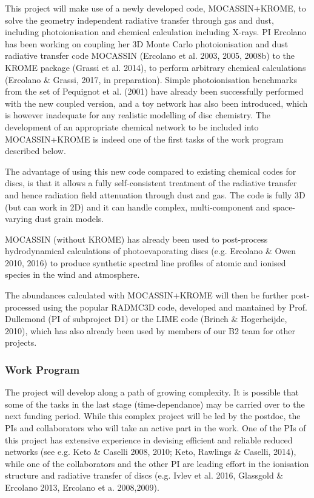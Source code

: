 \documentclass[10pt,fleqn,twoside]{article}
\newcommand{\Tcol}{\color{blue}}
\begin{document}
This project will make use of a newly developed code, MOCASSIN+KROME, to solve the geometry independent radiative transfer through gas  and dust, including photoionisation and chemical calculation
  including X-rays. PI Ercolano has been working on coupling her 3D Monte Carlo photoionisation
and dust radiative transfer code MOCASSIN (Ercolano et al. 2003, 2005,
2008b) to the KROME package (Grassi et al. 2014), to perform arbitrary
chemical calculations (Ercolano \& Grassi, 2017, in
preparation). Simple photoionisation benchmarks from the set of
Pequignot et al. (2001) have already been successfully performed with
the new coupled version, and a toy network has also
been introduced, which is however inadequate for any realistic
modelling of disc chemistry. The development of an appropriate
chemical network to be included into MOCASSIN+KROME is indeed one of
the first tasks of the work program described below.

The advantage of using this new code compared to existing chemical
codes for discs, is that it allows a fully self-consistent treatment
of the radiative transfer and hence radiation field attenuation
through dust and gas. The code is fully 3D (but can work in 2D) and it
can handle complex, multi-component and space-varying dust grain models. 

MOCASSIN (without KROME) has already been used to post-process
hydrodynamical calculations of photoevaporating discs (e.g. Ercolano
\& Owen 2010, 2016) to produce synthetic spectral line profiles of
atomic and ionised species in the wind and atmosphere. 

The abundances calculated with MOCASSIN+KROME will then be further
post-processed using the popular RADMC3D code, developed and mantained
by Prof. Dullemond (PI of subproject D1) or the LIME code (Brinch \&
Hogerheijde, 2010), which has also already been used by members of our
B2 team for other projects. 


\subsubsection{\Tcol Work Program}


The project will develop along a path of growing complexity. It is possible that some of the tasks in the last stage (time-dependance) may be carried over to the next funding period. While this complex project will be led by the postdoc, the PIs and collaborators who will take an active part in the work. One of the PIs of this project has extensive experience in devising efficient and reliable reduced networks (see e.g.  Keto \& Caselli 2008, 2010; Keto, Rawlings \& Caselli, 2014), while one of the collaborators and the other PI are leading effort in the ionisation structure and radiative transfer of discs (e.g. Ivlev et al. 2016, Glassgold \& Ercolano 2013, Ercolano et a. 2008,2009).  
\end{document}
